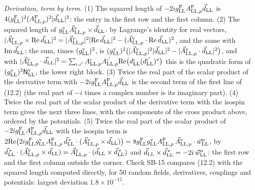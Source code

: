 \documentclass[
  10pt,
]{article}
\begin{document}
\emph{Derivation, term by term.} (1) The squared length of
\(-2ig^{\rm F}_{\rm LL}A^{\rm F}_{{\rm LL},p}\vec d_{\rm LL}\) is
\(4(g^{\rm F}_{\rm LL})^2(A^{\rm F}_{{\rm LL},p})^2\lvert\vec d_{\rm LL}\rvert^2\):
the entry in the first row and the first column. (2) The squared length
of
\(g^{\rm v}_{\rm LL}\vec A^{\rm v}_{{\rm LL},p}\times\vec d_{\rm LL}\):
by Lagrange's identity for real vectors,
\(\lvert\vec A^{\rm v}_{{\rm LL},p}\times{\rm Re}\,\vec d_{\rm LL}\rvert^2=\lvert\vec A^{\rm v}_{{\rm LL},p}\rvert^2\lvert{\rm Re}\,\vec d_{\rm LL}\rvert^2-(\vec A^{\rm v}_{{\rm LL},p}\cdot{\rm Re}\,\vec d_{\rm LL})^2\),
and the same with \({\rm Im}\,\vec d_{\rm LL}\); the sum, times
\((g^{\rm v}_{\rm LL})^2\), is
\((g^{\rm v}_{\rm LL})^2\big(\lvert\vec A^{\rm v}_{{\rm LL},p}\rvert^2\lvert\vec d_{\rm LL}\rvert^2-\lvert\vec A^{\rm v}_{{\rm LL},p}\cdot\vec d_{\rm LL}\rvert^2\big)\),
and with
\(\lvert\vec A^{\rm v}_{{\rm LL},p}\cdot\vec d_{\rm LL}\rvert^2=\sum_{\iota,\iota'}A^\iota_{{\rm LL},p}A^{\iota'}_{{\rm LL},p}{\rm Re}\big(d^\iota_{\rm LL}(d^{\iota'}_{\rm LL})^*\big)\)
this is the quadratic form of
\((g^{\rm v}_{\rm LL})^2\mathsf N^{\rm v}_{\rm LL}\), the lower right
block. (3) Twice the real part of the scalar product of the derivative
term with \(-2ig^{\rm F}_{\rm LL}A^{\rm F}_{{\rm LL},p}\vec d_{\rm LL}\)
is the second term of the first line of (12.2) (the real part of \(-i\)
times a complex number is its imaginary part). (4) Twice the real part
of the scalar product of the derivative term with the isospin term gives
the next three lines, with the components of the cross product above,
ordered by the potentials. (5) Twice the real part of the scalar product
of \(-2ig^{\rm F}_{\rm LL}A^{\rm F}_{{\rm LL},p}\vec d_{\rm LL}\) with
the isospin term is
\(2{\rm Re}\big(2ig^{\rm F}_{\rm LL}g^{\rm v}_{\rm LL}A^{\rm F}_{{\rm LL},p}\,\vec d^{\,*}_{\rm LL}\cdot(\vec A^{\rm v}_{{\rm LL},p}\times\vec d_{\rm LL})\big)=8g^{\rm F}_{\rm LL}g^{\rm v}_{\rm LL}A^{\rm F}_{{\rm LL},p}\,\vec A^{\rm v}_{{\rm LL},p}\cdot\vec w^{\rm n}_{\rm LL}\),
by
\(\vec d^{\,*}_{\rm LL}\cdot(\vec A^{\rm v}_{{\rm LL},p}\times\vec d_{\rm LL})=\vec A^{\rm v}_{{\rm LL},p}\cdot(\vec d_{\rm LL}\times\vec d^{\,*}_{\rm LL})\)
and
\(\vec d_{\rm LL}\times\vec d^{\,*}_{\rm LL}=-2i\,\vec w^{\rm n}_{\rm LL}\):
the first row and the first column outside the corner. Check SB-15
compares (12.2) with the squared length computed directly, for 50 random
fields, derivatives, couplings and potentials: largest deviation
\(1.8\times10^{-15}\).
\end{document}

